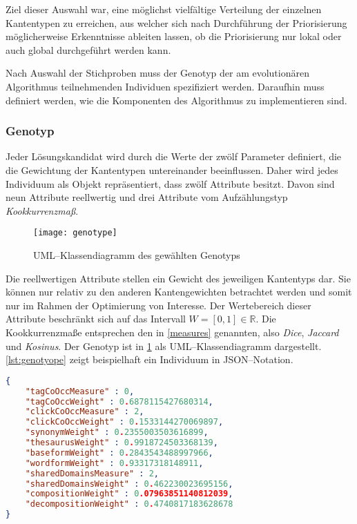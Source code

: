Ziel dieser Auswahl war, eine möglichst vielfältige Verteilung der einzelnen Kantentypen zu erreichen, aus welcher sich nach Durchführung der Priorisierung möglicherweise Erkenntnisse ableiten lassen, ob die Priorisierung nur lokal oder auch global durchgeführt werden kann.

Nach Auswahl der Stichproben muss der Genotyp der am evolutionären Algorithmus teilnehmenden Individuen spezifiziert werden. Daraufhin muss definiert werden, wie die Komponenten des Algorithmus zu implementieren sind.

\subsubsection{Genotyp}

Jeder Lösungskandidat wird durch die Werte der zwölf Parameter definiert, die die Gewichtung der Kantentypen untereinander beeinflussen. Daher wird jedes Individuum als Objekt repräsentiert, dass zwölf Attribute besitzt. Davon sind neun Attribute reellwertig und drei Attribute vom Aufzählungstyp \emph{Kookkurrenzmaß}.

\begin{figure}
\centering
\texttt{[image: genotype]}
\caption{UML--Klassendiagramm des gewählten Genotyps}
\label{fig:genotype}
\end{figure}

Die reellwertigen Attribute stellen ein Gewicht des jeweiligen Kantentyps dar. Sie können nur relativ zu den anderen Kantengewichten betrachtet werden und somit nur im Rahmen der Optimierung von Interesse. Der Wertebereich dieser Attribute beschränkt sich auf das Intervall \(W=[0,1] \in \mathbb{R}\). Die Kookkurrenzmaße entsprechen den in \cref{measures} genannten, also \emph{Dice}, \emph{Jaccard} und \emph{Kosinus}. Der Genotyp ist in \cref{fig:genotype} als UML--Klassendiagramm dargestellt. \cref{lst:genotyope} zeigt beispielhaft ein Individuum in JSON--Notation.

\begin{lstlisting}[language=json, label={lst:genotyope}, caption={JSON--Beispiel für ein Individuum}, float=b]
{
    "tagCoOccMeasure" : 0,
    "tagCoOccWeight" : 0.6878115427680314,
    "clickCoOccMeasure" : 2,
    "clickCoOccWeight" : 0.1533144270069897,
    "synonymWeight" : 0.2355003503616899,
    "thesaurusWeight" : 0.9918724503368139,
    "baseformWeight" : 0.2843543488997966,
    "wordformWeight" : 0.93317318148911,
    "sharedDomainsMeasure" : 2,
    "sharedDomainsWeight" : 0.462230023695156,
    "compositionWeight" : 0.07963851140812039,
    "decompositionWeight" : 0.4740817183628678
}
\end{lstlisting}


